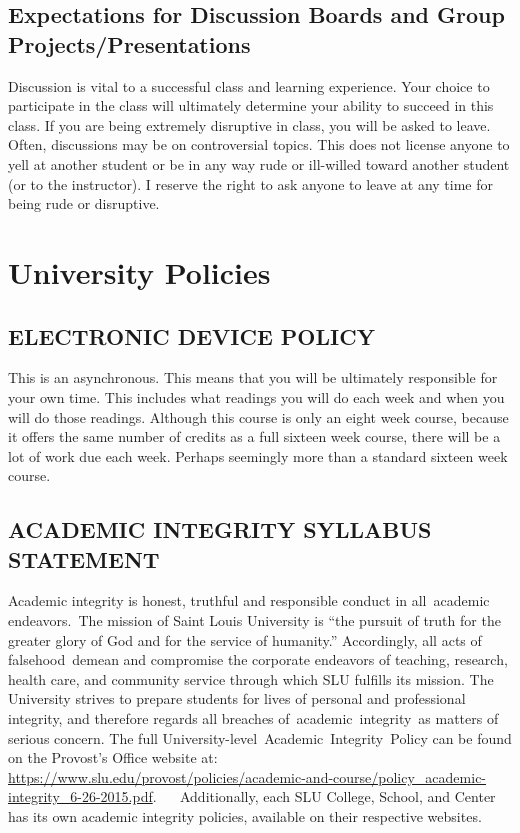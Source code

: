 \documentclass[11pt,]{article}
\begin{document}
\subsection{Expectations for Discussion Boards and Group
Projects/Presentations}\label{expectations-for-discussion-boards-and-group-projectspresentations}

Discussion is vital to a successful class and learning experience. Your
choice to participate in the class will ultimately determine your
ability to succeed in this class. If you are being extremely disruptive
in class, you will be asked to leave. Often, discussions may be on
controversial topics. This does not license anyone to yell at another
student or be in any way rude or ill-willed toward another student (or
to the instructor). I reserve the right to ask anyone to leave at any
time for being rude or disruptive.

\section{University Policies}\label{university-policies}

\subsection{ELECTRONIC DEVICE POLICY}\label{electronic-device-policy}

This is an asynchronous. This means that you will be ultimately
responsible for your own time. This includes what readings you will do
each week and when you will do those readings. Although this course is
only an eight week course, because it offers the same number of credits
as a full sixteen week course, there will be a lot of work due each
week. Perhaps seemingly more than a standard sixteen week course.

\subsection{ACADEMIC INTEGRITY SYLLABUS
STATEMENT}\label{academic-integrity-syllabus-statement}

Academic integrity is honest, truthful and responsible conduct in
all~academic endeavors.~The mission of Saint Louis University is ``the
pursuit of truth for the greater glory of God and for the service of
humanity.'' Accordingly, all acts of falsehood~demean and compromise the
corporate endeavors of teaching, research, health care, and community
service through which SLU fulfills its mission. The University strives
to prepare students for lives of personal and professional integrity,
and therefore regards all breaches of~academic~integrity~as matters of
serious concern. The full University-level~Academic~Integrity~Policy can
be found on the Provost's Office website at:
\url{https://www.slu.edu/provost/policies/academic-and-course/policy_academic-integrity_6-26-2015.pdf}.~
~ Additionally, each SLU College, School, and Center has its own
academic integrity policies, available on their respective websites.
\end{document}
